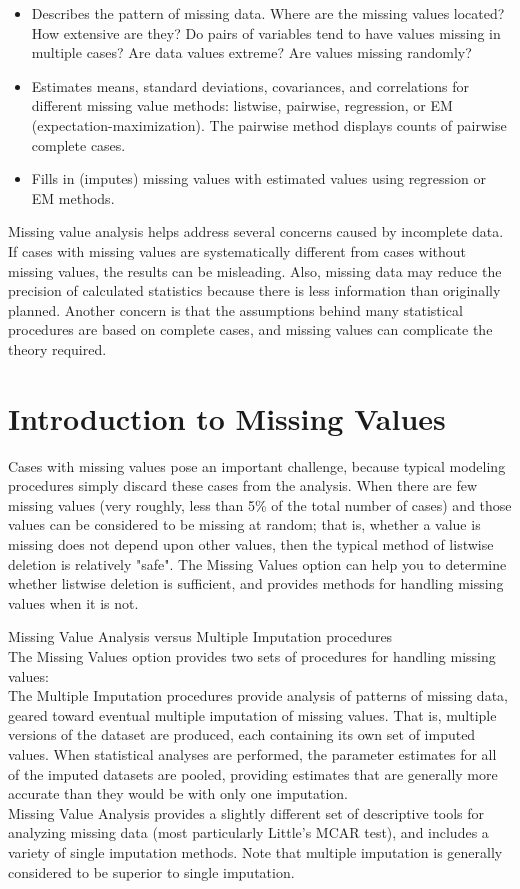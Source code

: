 \documentclass[12pt]{article}
\begin{document}
\begin{itemize}
\item Describes the pattern of missing data. Where are the missing values located? How extensive
are they? Do pairs of variables tend to have values missing in multiple cases? Are data
values extreme? Are values missing randomly?
\item Estimates means, standard deviations, covariances, and correlations for different missing
value methods: listwise, pairwise, regression, or EM (expectation-maximization). The
pairwise method displays counts of pairwise complete cases.
\item Fills in (imputes) missing values with estimated values using regression or EM methods.
\end{itemize}

Missing value analysis helps address several concerns caused by incomplete data. If cases with
missing values are systematically different from cases without missing values, the results can be
misleading. Also, missing data may reduce the precision of calculated statistics because there
is less information than originally planned. Another concern is that the assumptions behind
many statistical procedures are based on complete cases, and missing values can complicate
the theory required.


\newpage
\section{Introduction to Missing Values}

Cases with missing values pose an important challenge, because typical modeling procedures simply discard these cases from the analysis. When there are few missing values (very roughly, less than 5\% of the total number of cases) and those values can be considered to be missing at random; that is, whether a value is missing does not depend upon other values, then the typical method of listwise deletion is relatively "safe". The Missing Values option can help you to determine whether listwise deletion is sufficient, and provides methods for handling missing values when it is not.

Missing Value Analysis versus Multiple Imputation procedures
\\
The Missing Values option provides two sets of procedures for handling missing values:
\\
The Multiple Imputation procedures provide analysis of patterns of missing data, geared toward eventual multiple imputation of missing values. That is, multiple versions of the dataset are produced, each containing its own set of imputed values. When statistical analyses are performed, the parameter estimates for all of the imputed datasets are pooled, providing estimates that are generally more accurate than they would be with only one imputation.
\\
Missing Value Analysis provides a slightly different set of descriptive tools for analyzing missing data (most particularly Little's MCAR test), and includes a variety of single imputation methods. Note that multiple imputation is generally considered to be superior to single imputation.
\end{document}

